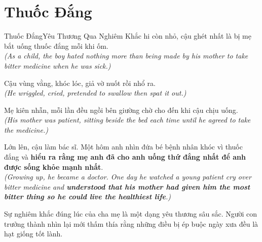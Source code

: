 \section{Thuốc Đắng}
\begin{truyen}{Thuốc Đắng}{Yêu Thương Qua Nghiêm Khắc}
hi còn nhỏ, cậu ghét nhất là bị mẹ bắt uống thuốc đắng mỗi khi ốm.\\
\textit{(As a child, the boy hated nothing more than being made by his mother to take bitter medicine when he was sick.)}

Cậu vùng vằng, khóc lóc, giả vờ nuốt rồi nhổ ra.\\
\textit{(He wriggled, cried, pretended to swallow then spat it out.)}

Mẹ kiên nhẫn, mỗi lần đều ngồi bên giường chờ cho đến khi cậu chịu uống.\\
\textit{(His mother was patient, sitting beside the bed each time until he agreed to take the medicine.)}

Lớn lên, cậu làm bác sĩ. Một hôm anh nhìn đứa bé bệnh nhân khóc vì thuốc đắng và \textbf{hiểu ra rằng mẹ anh đã cho anh uống thứ đắng nhất để anh được sống khỏe mạnh nhất}.\\
\textit{(Growing up, he became a doctor. One day he watched a young patient cry over bitter medicine and \textbf{understood that his mother had given him the most bitter thing so he could live the healthiest life}.)}
\end{truyen}
\begin{baihoc}
  Sự nghiêm khắc đúng lúc của cha mẹ là một dạng yêu thương sâu sắc. Người con trưởng thành nhìn lại mới thấm thía rằng những điều bị ép buộc ngày xưa đều là hạt giống tốt lành.
\end{baihoc}

